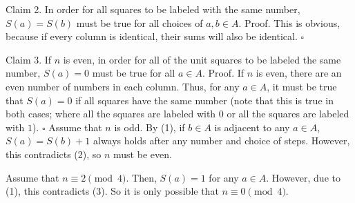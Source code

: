 \documentclass[a4paper]{article}
\begin{document}
\begin{question*}{}
{        Claim 2. In order for all squares to be labeled with the same number, $S(a) = S(b)$ must be true for all choices of $a, b \in A$.
        Proof. This is obvious, because if every column is identical, their sums will also be identical. $\square$

        Claim 3. If $n$ is even, in order for all of the unit squares to be labeled the same number, $S(a) = 0$ must be true for all $a \in A$.
        Proof. If $n$ is even, there are an even number of numbers in each column. Thus, for any $a \in A$, it must be true that $S(a) = 0$ if all squares have the same number (note that this is true in both cases; where all the squares are labeled with $0$ or all the squares are labeled with $1$). $\square$
        Assume that $n$ is odd. By (1), if $b \in A$ is adjacent to any $a \in A$, $S(a) = S(b) + 1$ always holds after any number and choice of steps. However, this contradicts (2), so $n$ must be even.

        Assume that $n \equiv 2 \pmod 4$. Then, $S(a) = 1$ for any $a \in A$. However, due to (1), this contradicts (3). So it is only possible that $n \equiv 0 \pmod 4$.

}
\end{question*}
\end{document}
